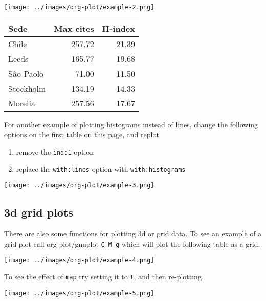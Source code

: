 \documentclass[11pt]{article}
\begin{document}
\begin{center}
\texttt{[image: ../images/org-plot/example-2.png]}
\end{center}

\begin{center}
\begin{tabular}{lrr}
Sede & Max cites & H-index\\
\hline
Chile & 257.72 & 21.39\\
Leeds & 165.77 & 19.68\\
São Paolo & 71.00 & 11.50\\
Stockholm & 134.19 & 14.33\\
Morelia & 257.56 & 17.67\\
\end{tabular}
\end{center}


For another example of plotting histograms instead of lines, change
the following options on the first table on this page, and replot
\begin{enumerate}
\item remove the \texttt{ind:1} option
\item replace the \texttt{with:lines} option with \texttt{with:histograms}
\end{enumerate}

\begin{center}
\texttt{[image: ../images/org-plot/example-3.png]}
\end{center}

\subsection*{3d grid plots}
\label{sec:org6d7a0c0}

There are also some functions for plotting 3d or grid data.  To see an
example of a grid plot call org-plot/gnuplot \texttt{C-M-g} which will plot
the following table as a grid.

\begin{center}
\texttt{[image: ../images/org-plot/example-4.png]}
\end{center}

To see the effect of \texttt{map} try setting it to \texttt{t}, and then
re-plotting.

\begin{center}
\texttt{[image: ../images/org-plot/example-5.png]}
\end{center}
\end{document}
